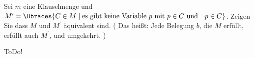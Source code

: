 
\begin{exercise}[45]

Sei $m$ eine Klauselmenge und $M^\prime = \Bbraces{C \in M \mid \text{es gibt keine Variable}~ p ~\text{mit}~ p \in C ~\text{und}~ \neg p \in C}$.
Zeigen Sie dass $M$ und $M^\prime$ äquivalent sind.
(
    Das heißt:
    Jede Belegung $b$, die $M$ erfüllt, erfüllt auch $M^\prime$, und umgekehrt.
)

\end{exercise}


\begin{solution}

ToDo!

\end{solution}

